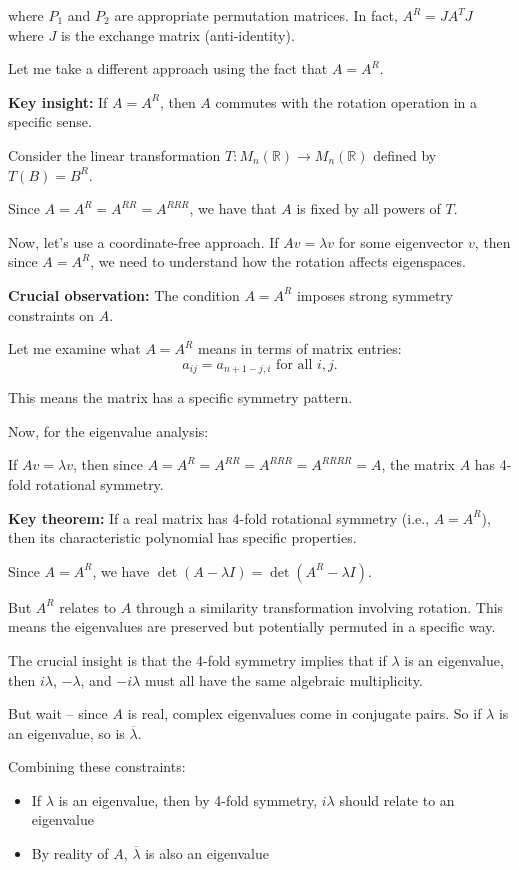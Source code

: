 \documentclass[12pt,a4paper]{article}
\theoremstyle{definition}
\begin{document}
    where $P_1$ and $P_2$ are appropriate permutation matrices. In fact, $A^R = JA^TJ$ where $J$ is the exchange matrix (anti-identity).

    Let me take a different approach using the fact that $A = A^R$.

    \textbf{Key insight:} If $A = A^R$, then $A$ commutes with the rotation operation in a specific sense.

    Consider the linear transformation $T: M_n(\mathbb{R}) \to M_n(\mathbb{R})$ defined by $T(B) = B^R$.

    Since $A = A^R = A^{RR} = A^{RRR}$, we have that $A$ is fixed by all powers of $T$.

    Now, let's use a coordinate-free approach. If $Av = \lambda v$ for some eigenvector $v$, then since $A = A^R$, we need to understand how the rotation affects eigenspaces.

    \textbf{Crucial observation:} The condition $A = A^R$ imposes strong symmetry constraints on $A$.

    Let me examine what $A = A^R$ means in terms of matrix entries:
    $$a_{ij} = a_{n+1-j,i} \text{ for all } i,j.$$

    This means the matrix has a specific symmetry pattern.

    Now, for the eigenvalue analysis:

    If $Av = \lambda v$, then since $A = A^R = A^{RR} = A^{RRR} = A^{RRRR} = A$, the matrix $A$ has 4-fold rotational symmetry.

    \textbf{Key theorem:} If a real matrix has 4-fold rotational symmetry (i.e., $A = A^R$), then its characteristic polynomial has specific properties.

    Since $A = A^R$, we have $\det(A - \lambda I) = \det(A^R - \lambda I)$.

    But $A^R$ relates to $A$ through a similarity transformation involving rotation. This means the eigenvalues are preserved but potentially permuted in a specific way.

    The crucial insight is that the 4-fold symmetry implies that if $\lambda$ is an eigenvalue, then $i\lambda$, $-\lambda$, and $-i\lambda$ must all have the same algebraic multiplicity.

    But wait -- since $A$ is real, complex eigenvalues come in conjugate pairs. So if $\lambda$ is an eigenvalue, so is $\overline{\lambda}$.

    Combining these constraints:
    \begin{itemize}
        \item If $\lambda$ is an eigenvalue, then by 4-fold symmetry, $i\lambda$ should relate to an eigenvalue
        \item By reality of $A$, $\overline{\lambda}$ is also an eigenvalue
    \end{itemize}
\end{document}
